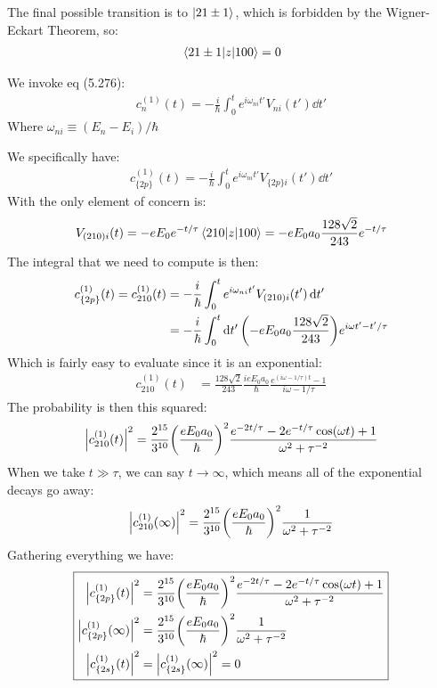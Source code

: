 \documentclass[12pt]{article}
\begin{document}
The final possible transition is to $\ket{21\pm1}$, which is forbidden by the Wigner-Eckart Theorem, so:
\begin{align*}
  \mel{21\pm1}{z}{100}=0
\end{align*}
\begin{thebook}
  We invoke eq (5.276):
  \begin{align*}
    c_{n}^{(1)}(t)=-\frac{i}{\hbar}\int_0^t e^{i\omega_{ni}t'}V_{ni}(t')\dd{t'}
  \end{align*}
  Where $\omega_{ni}\equiv(E_n-E_i)/\hbar$
\end{thebook}
We specifically have:
  \begin{align*}
    c_{\{2p\}}^{(1)}(t)=-\frac{i}{\hbar}\int_0^t e^{i\omega_{ni}t'}V_{\{2p\}i}(t')\dd{t'}
  \end{align*}
With the only element of concern is:
\begin{align*}
  V_{(210)i}(t)=-eE_0e^{-t/\tau}\mel{210}{z}{100}=
  -eE_0a_0\frac{128\sqrt{2}}{243}e^{-t/\tau}
\end{align*}
The integral that we need to compute is then:
\begin{align*}
  c_{\{2p\}}^{(1)}(t)=c_{210}^{(1)}(t)&=-\frac{i}{\hbar}
  \int_0^t e^{i\omega_{ni}t'}V_{(210)i}(t')\dd{t'}\\
  &=-\frac{i}{\hbar}\int_0^t\dd{t'}\qty(-eE_0a_0\frac{128\sqrt{2}}{243})
  e^{i\omega t'-t'/\tau}
\end{align*}
Which is fairly easy to evaluate since it is an exponential:
\begin{align*}
  c_{210}^{(1)}(t)&=\frac{128\sqrt{2}}{243}\frac{ieE_0a_0}\hbar
  \frac{e^{(i\omega-1/\tau)t}-1}{i\omega-1/\tau}
\end{align*}
The probability is then this squared:
\begin{align*}
  \abs{c_{210}^{(1)}(t)}^2=
  \frac{2^{15}}{3^{10}}\qty(\frac{eE_0a_0}\hbar)^2
  \frac{e^{-2t/\tau}-2e^{-t/\tau}\cos(\omega t)+1}{\omega^2+\tau^{-2}}
\end{align*}
When we take $t\gg\tau$, we can say $t\to\infty$, which means all of the exponential decays go away:
\begin{align*}
  \abs{c_{210}^{(1)}(\infty)}^2=
  \frac{2^{15}}{3^{10}}\qty(\frac{eE_0a_0}\hbar)^2\frac1{\omega^2+\tau^{-2}}
\end{align*}
Gathering everything we have:
\begin{equation}
\boxed{  \begin{aligned}
    \abs{c_{\{2p\}}^{(1)}(t)}^2&=\frac{2^{15}}{3^{10}}\qty(\frac{eE_0a_0}\hbar)^2
    \frac{e^{-2t/\tau}-2e^{-t/\tau}\cos(\omega t)+1}{\omega^2+\tau^{-2}}\\
    \abs{c_{\{2p\}}^{(1)}(\infty)}^2&=\frac{2^{15}}{3^{10}}
    \qty(\frac{eE_0a_0}\hbar)^2\frac1{\omega^2+\tau^{-2}}\\
    \abs{c_{\{2s\}}^{(1)}(t)}^2&=\abs{c_{\{2s\}}^{(1)}(\infty)}^2=0
  \end{aligned}}
\end{equation}
\end{document}
